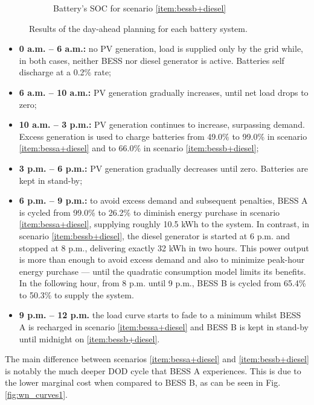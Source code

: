 \documentclass{ieeeaccess}
\begin{document}
\begin{figure}[!h]
\begin{subfigure}{.235\textwidth}
            \caption{Battery's \ac{SOC} for scenario \ref{item:bessb+diesel}}
            \label{fig:result-soc-B}
        \end{subfigure}
        \caption{Results of the day-ahead planning for each battery system.}
        \label{fig:results}
    \end{figure}

    \begin{itemize}
        \item \textbf{0 a.m. -- 6 a.m.:} no \ac{PV} generation, load is supplied only by the grid while, in both cases, neither \ac{BESS} nor diesel generator is active. Batteries self discharge at a 0.2\% rate;
        \item \textbf{6 a.m. -- 10 a.m.:} \ac{PV} generation gradually increases, until net load drops to zero;
        \item \textbf{10 a.m. -- 3 p.m.:} \ac{PV} generation continues to increase, surpassing demand. Excess generation is used to charge batteries from 49.0\% to 99.0\% in scenario \ref{item:bessa+diesel} and to 66.0\% in scenario \ref{item:bessb+diesel};
        \item \textbf{3 p.m. -- 6 p.m.:} \ac{PV} generation gradually decreases until zero. Batteries are kept in stand-by;
        \item \textbf{6 p.m. -- 9 p.m.:} to avoid excess demand and subsequent penalties, \ac{BESS} A is cycled from 99.0\% to 26.2\% to diminish energy purchase in scenario \ref{item:bessa+diesel}, supplying roughly 10.5 kWh to the system. In contrast, in scenario \ref{item:bessb+diesel}, the diesel generator is started at 6 p.m. and stopped at 8 p.m., delivering exactly 32 kWh in two hours. This power output is more than enough to avoid excess demand and also to minimize peak-hour energy purchase --- until the quadratic consumption model limits its benefits. In the following hour, from 8 p.m. until 9 p.m., \ac{BESS} B is cycled from 65.4\% to 50.3\% to supply the system.
        \item \textbf{9 p.m. -- 12 p.m.} the load curve starts to fade to a minimum whilst \ac{BESS} A is recharged in scenario \ref{item:bessa+diesel} and \ac{BESS} B is kept in stand-by until midnight on \ref{item:bessb+diesel}.
    \end{itemize}

    The main difference between scenarios \ref{item:bessa+diesel} and \ref{item:bessb+diesel} is notably the much deeper \ac{DOD} cycle that \ac{BESS} A experiences. This is due to the lower marginal cost when compared to \ac{BESS} B, as can be seen in Fig. \ref{fig:wn_curves1}.
\end{document}
